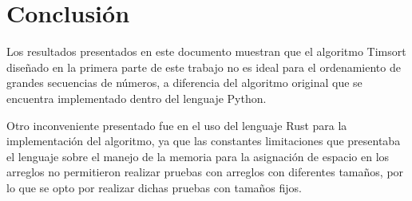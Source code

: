 \documentclass[a4paper]{article}
\theoremstyle{plain}
\theoremstyle{definition}
\begin{document}
	\section{Conclusión}
	\label{sec:def}
	\hspace
	Los resultados presentados en este documento muestran que el algoritmo Timsort diseñado en la primera parte de este trabajo no es ideal para el ordenamiento de grandes secuencias de números, a diferencia del algoritmo original que se encuentra implementado dentro del lenguaje Python.
	
    Otro inconveniente presentado fue en el uso del lenguaje Rust para la implementación del algoritmo, ya que las constantes limitaciones que presentaba el lenguaje sobre el manejo de la memoria para la asignación de espacio en los arreglos no permitieron realizar pruebas con arreglos con diferentes tamaños, por lo que se opto por realizar dichas pruebas con tamaños fijos.
\end{document}
